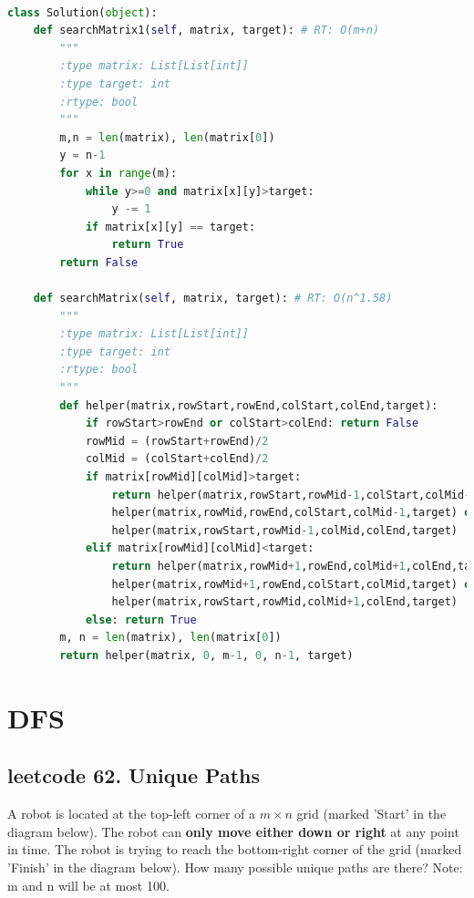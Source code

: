 \documentclass[a4paper,10pt]{article}
\begin{document}
\begin{lstlisting}[language=Python, caption=Problem240. Search a 2D Matrix II]

class Solution(object):
    def searchMatrix1(self, matrix, target): # RT: O(m+n)
        """
        :type matrix: List[List[int]]
        :type target: int
        :rtype: bool
        """
        m,n = len(matrix), len(matrix[0])
        y = n-1
        for x in range(m):
            while y>=0 and matrix[x][y]>target:
                y -= 1
            if matrix[x][y] == target:
                return True
        return False
    
    def searchMatrix(self, matrix, target): # RT: O(n^1.58)
        """
        :type matrix: List[List[int]]
        :type target: int
        :rtype: bool
        """
        def helper(matrix,rowStart,rowEnd,colStart,colEnd,target):
            if rowStart>rowEnd or colStart>colEnd: return False
            rowMid = (rowStart+rowEnd)/2
            colMid = (colStart+colEnd)/2
            if matrix[rowMid][colMid]>target:
                return helper(matrix,rowStart,rowMid-1,colStart,colMid-1,target) or
                helper(matrix,rowMid,rowEnd,colStart,colMid-1,target) or
                helper(matrix,rowStart,rowMid-1,colMid,colEnd,target)
            elif matrix[rowMid][colMid]<target:
                return helper(matrix,rowMid+1,rowEnd,colMid+1,colEnd,target) or
                helper(matrix,rowMid+1,rowEnd,colStart,colMid,target) or
                helper(matrix,rowStart,rowMid,colMid+1,colEnd,target)
            else: return True
        m, n = len(matrix), len(matrix[0])
        return helper(matrix, 0, m-1, 0, n-1, target)
\end{lstlisting}





















\section{DFS}
\subsection{leetcode 62. Unique Paths}
A robot is located at the top-left corner of a $m \times n$ grid (marked 'Start' in the diagram below). The robot can \textbf{only move either down or right} at any point in time. The robot is trying to reach the bottom-right corner of the grid (marked 'Finish' in the diagram below). How many possible unique paths are there? Note: m and n will be at most 100. \\
\end{document}
